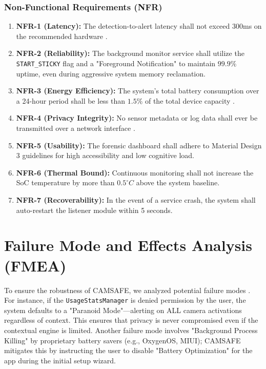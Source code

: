 \documentclass[12pt,a4paper]{report}
\begin{document}
\begin{enumerate}
    \subsubsection{Non-Functional Requirements (NFR)}
    \begin{enumerate}
        \item \textbf{NFR-1 (Latency):} The detection-to-alert latency shall not exceed 300ms on the recommended hardware \cite{androidhal}.
        \item \textbf{NFR-2 (Reliability):} The background monitor service shall utilize the \texttt{START\_STICKY} flag and a "Foreground Notification" to maintain $99.9\%$ uptime, even during aggressive system memory reclamation.
        \item \textbf{NFR-3 (Energy Efficiency):} The system's total battery consumption over a 24-hour period shall be less than $1.5\%$ of the total device capacity \cite{edgecomp}.
        \item \textbf{NFR-4 (Privacy Integrity):} No sensor metadata or log data shall ever be transmitted over a network interface \cite{edgecomp}.
        \item \textbf{NFR-5 (Usability):} The forensic dashboard shall adhere to Material Design 3 guidelines for high accessibility and low cognitive load.
        \item \textbf{NFR-6 (Thermal Bound):} Continuous monitoring shall not increase the SoC temperature by more than $0.5^{\circ}C$ above the system baseline.
        \item \textbf{NFR-7 (Recoverability):} In the event of a service crash, the system shall auto-restart the listener module within 5 seconds.
    \end{enumerate}
    \section{Failure Mode and Effects Analysis (FMEA)}
    To ensure the robustness of CAMSAFE, we analyzed potential failure modes \cite{malwaresurvey}. For instance, if the \texttt{UsageStatsManager} is denied permission by the user, the system defaults to a "Paranoid Mode"—alerting on ALL camera activations regardless of context. This ensures that privacy is never compromised even if the contextual engine is limited. Another failure mode involves "Background Process Killing" by proprietary battery savers (e.g., OxygenOS, MIUI); CAMSAFE mitigates this by instructing the user to disable "Battery Optimization" for the app during the initial setup wizard.

\end{enumerate}
\end{document}

